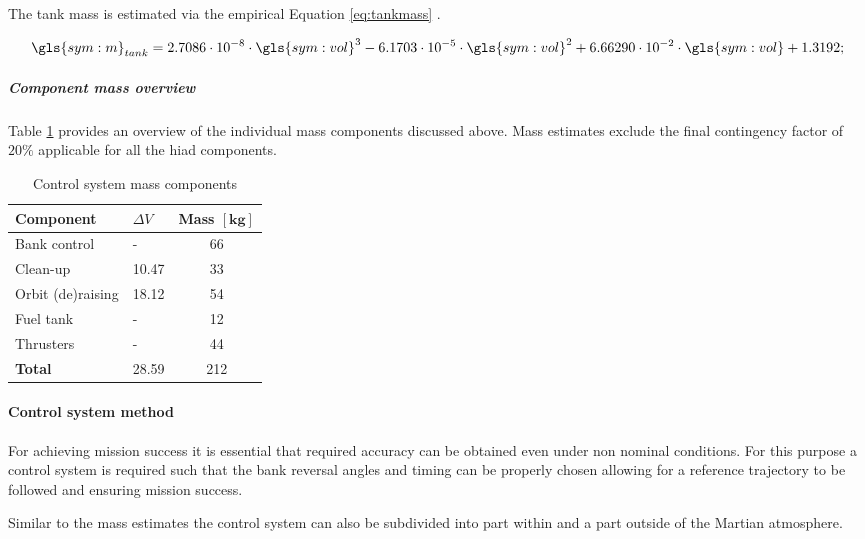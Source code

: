 The tank mass is estimated via the empirical Equation \ref{eq:tankmass} \cite[p.543]{Wertz2011}.

\begin{equation}
\label{eq:tankmass} 
\gls{sym:m}_{tank}=2.7086 \cdot 10^{-8} \cdot \gls{sym:vol}^3 -6.1703 \cdot 10^{-5} \cdot \gls{sym:vol}^2 +6.66290 \cdot 10^{-2}  \cdot \gls{sym:vol} +1.3192;
\end{equation}

\subparagraph{Component mass overview}

Table \ref{tab:controlmassbreakdown} provides an overview of the individual mass components discussed above. Mass estimates exclude the final contingency factor of $20\%$ applicable for all the \gls{hiad} components.

\begin{table}[h]
\centering
\caption{Control system mass components}
\label{tab:controlmassbreakdown}
\begin{tabular}{|l|l|c|} \hline
\textbf{Component}           &\textbf{$\Delta V$}  & \textbf{Mass $\mathbf{[kg]}$} \\ \hline \hline
Bank control    &  - &			 66       \\ \hline
Clean-up         & 10.47  &		  33       \\ \hline
Orbit (de)raising& 18.12  &		  54       \\ \hline
Fuel tank              		 & -  &  12      \\ \hline
Thrusters                	 & -  &  44     \\ \hline \hline
\textbf{Total}               & 28.59  &  212      \\ \hline
\end{tabular}
\end{table}

\paragraph{Control system method}

For achieving mission success it is essential that required accuracy can be obtained even under non nominal conditions. For this purpose a control system is required such that the bank reversal angles and timing can be properly chosen allowing for a reference trajectory to be followed and ensuring mission success.

Similar to the mass estimates the control system can  also be subdivided into part within and a part outside of the Martian atmosphere.

